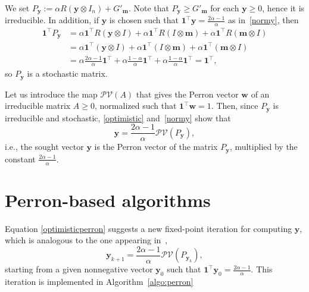 \documentclass[10pt]{paper}
\begin{document}
We set $P_{\mathbf{y}} := \alpha R({\mathbf{y}} \otimes I_n) + G'_{\mathbf{m}}$. Note that $P_{\mathbf{y}} \geq G'_{\mathbf{m}}$ for each ${\mathbf{y}}\geq 0$, hence it is irreducible. In addition, if ${\mathbf{y}}$ is chosen such that ${\mathbf{1}}^\top {\mathbf{y}} = \frac{2\alpha-1}{\alpha}$ as in~\eqref{normy}, then
\begin{equation} \label{conti}
	\begin{aligned}
		{\mathbf{1}}^\top P_{\mathbf{y}} &= \alpha {\mathbf{1}}^\top R({\mathbf{y}} \otimes I) + \alpha {\mathbf{1}}^\top R(I \otimes {\mathbf{m}}) + \alpha {\mathbf{1}}^\top R({\mathbf{m}} \otimes I)
		\\&= \alpha {\mathbf{1}}^\top ({\mathbf{y}} \otimes I) + \alpha {\mathbf{1}}^\top (I \otimes {\mathbf{m}}) + \alpha {\mathbf{1}}^\top ({\mathbf{m}} \otimes I)
		\\&= \alpha \frac{2\alpha-1}{\alpha} {\mathbf{1}}^\top + \alpha\frac{1-\alpha}{\alpha} {\mathbf{1}}^\top + \alpha\frac{1-\alpha}{\alpha} {\mathbf{1}}^\top = {\mathbf{1}}^\top,
	\end{aligned}	
\end{equation}
so $P_{\mathbf{y}}$ is a stochastic matrix.

Let us introduce the map $\mathcal{PV}(A)$ that gives the Perron vector ${\mathbf{w}}$ of an irreducible matrix $A \geq 0$, normalized such that ${\mathbf{1}}^\top {\mathbf{w}} = 1$. 
Then, since $P_{\mathbf{y}}$ is irreducible and stochastic, \eqref{optimistic} and~\eqref{normy} show that
\begin{equation} \label{optimisticperron}
	{\mathbf{y}} = \frac{2\alpha-1}{\alpha} \mathcal{PV}(P_{\mathbf{y}}),
\end{equation}
i.e., the sought vector ${\mathbf{y}}$ is the Perron vector of the matrix $P_{\mathbf{y}}$, multiplied by the constant $ \frac{2\alpha-1}{\alpha}$.

\section{Perron-based algorithms} \label{sec:perron}

Equation \eqref{optimisticperron} suggests a new fixed-point iteration for computing ${\mathbf{y}}$, 
which is analogous to the one appearing in~\cite{MeiP11},
\begin{equation}
	{\mathbf{y}}_{k+1} = \frac{2\alpha-1}{\alpha} \mathcal{PV}(P_{{\mathbf{y}}_k}),
\end{equation}
starting from a given nonnegative vector ${\mathbf{y}}_0$ such that ${\mathbf{1}}^\top {\mathbf{y}}_0 = \frac{2\alpha-1}{\alpha}$. This iteration is implemented in Algorithm~\ref{algo:perron}
\end{document}
